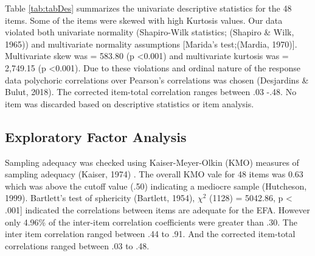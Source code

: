 \documentclass[
  english,
  man]{apa6}
\begin{document}
Table \ref{tab:tabDes} summarizes the univariate descriptive statistics for the 48 items. Some of the items were skewed with high Kurtosis values. Our data violated both univariate normality (Shapiro-Wilk statistics; (Shapiro \& Wilk, 1965)) and multivariate normality assumptions {[}Marida's test;(Mardia, 1970){]}. Multivariate skew was = 583.80 (p \textless0.001) and multivariate kurtosis was = 2,749.15 (p \textless0.001). Due to these violations and ordinal nature of the response data polychoric correlations over Pearson's correlations was chosen (Desjardins \& Bulut, 2018). The corrected item-total correlation ranges between .03 -.48. No item was discarded based on descriptive statistics or item analysis.

\hypertarget{exploratory-factor-analysis}{%
\subsection{Exploratory Factor Analysis}\label{exploratory-factor-analysis}}

Sampling adequacy was checked using Kaiser-Meyer-Olkin (KMO) measures of sampling adequacy (Kaiser, 1974) . The overall KMO vale for 48 items was 0.63 which was above the cutoff value (.50) indicating a mediocre sample (Hutcheson, 1999). Bartlett's test of sphericity (Bartlett, 1954), \(\chi^2\) (1128) = 5042.86, p \textless{} .001{]} indicated the correlations between items are adequate for the EFA. However only 4.96\% of the inter-item correlation coefficients were greater than .30. The inter item correlation ranged between .44 to .91. And the corrected item-total correlations ranged between .03 to .48.
\end{document}
